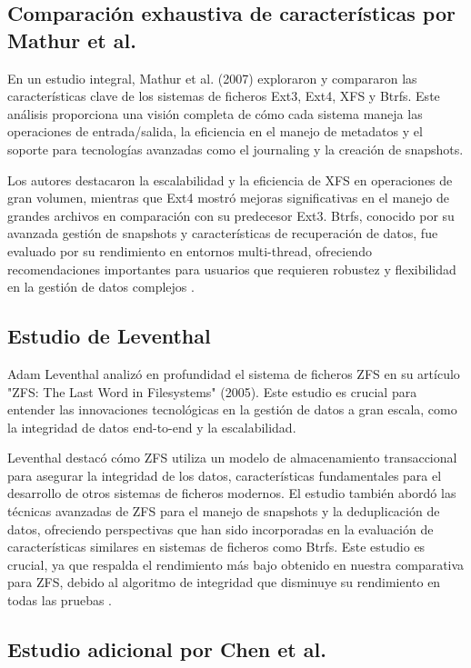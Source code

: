 \subsection{Comparación exhaustiva de características por Mathur et al.}

En un estudio integral, Mathur et al. (2007) exploraron y compararon las características clave de los sistemas de ficheros Ext3, Ext4, XFS y Btrfs. Este análisis proporciona una visión completa de cómo cada sistema maneja las operaciones de entrada/salida, la eficiencia en el manejo de metadatos y el soporte para tecnologías avanzadas como el journaling y la creación de snapshots.

Los autores destacaron la escalabilidad y la eficiencia de XFS en operaciones de gran volumen, mientras que Ext4 mostró mejoras significativas en el manejo de grandes archivos en comparación con su predecesor Ext3. Btrfs, conocido por su avanzada gestión de snapshots y características de recuperación de datos, fue evaluado por su rendimiento en entornos multi-thread, ofreciendo recomendaciones importantes para usuarios que requieren robustez y flexibilidad en la gestión de datos complejos \cite{mathur2007filesystem}.

\subsection{Estudio de Leventhal}

Adam Leventhal analizó en profundidad el sistema de ficheros ZFS en su artículo "ZFS: The Last Word in Filesystems" (2005). Este estudio es crucial para entender las innovaciones tecnológicas en la gestión de datos a gran escala, como la integridad de datos end-to-end y la escalabilidad.

Leventhal destacó cómo ZFS utiliza un modelo de almacenamiento transaccional para asegurar la integridad de los datos, características fundamentales para el desarrollo de otros sistemas de ficheros modernos. El estudio también abordó las técnicas avanzadas de ZFS para el manejo de snapshots y la deduplicación de datos, ofreciendo perspectivas que han sido incorporadas en la evaluación de características similares en sistemas de ficheros como Btrfs. Este estudio es crucial, ya que respalda el rendimiento más bajo obtenido en nuestra comparativa para ZFS, debido al algoritmo de integridad que disminuye su rendimiento en todas las pruebas \cite{leventhal2005zfs}.

\subsection{Estudio adicional por Chen et al.}

